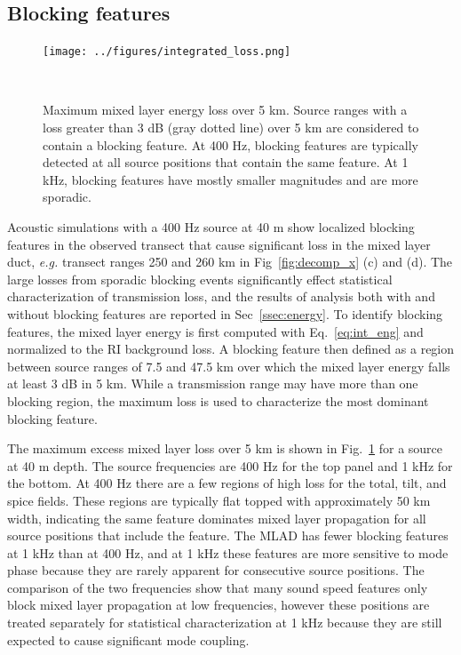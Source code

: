 \documentclass[preprint,NumberedRefs]{JASA}
\begin{document}
\subsection{Blocking features}\label{ssec:blocking}
\begin{figure}
\texttt{[image: ../figures/integrated\_loss.png]}
    \caption{Maximum mixed layer energy loss over 5 km. Source ranges with a loss greater than 3 dB (gray dotted line) over 5 km are considered to contain a blocking feature. At 400 Hz, blocking features are typically detected at all source positions that contain the same feature. At 1 kHz, blocking features have mostly smaller magnitudes and are more sporadic.}
    \label{fig:blocking}
\end{figure}

Acoustic simulations with a 400 Hz source at 40 m show localized blocking features in the observed transect that cause significant loss in the mixed layer duct, \emph{e.g.} transect ranges 250 and 260 km in Fig~\ref{fig:decomp_x} (c) and (d). The large losses from sporadic blocking events significantly effect statistical characterization of transmission loss, and the results of analysis both with and without blocking features are reported in Sec~\ref{ssec:energy}. To identify blocking features, the mixed layer energy is first computed with Eq.~\eqref{eq:int_eng} and normalized to the RI background loss. A blocking feature then defined as a region between source ranges of 7.5 and 47.5 km over which the mixed layer energy falls at least 3 dB in 5 km. While a transmission range may have more than one blocking region, the maximum loss is used to characterize the most dominant blocking feature.

The maximum excess mixed layer loss over 5 km is shown in Fig.~\ref{fig:blocking} for a source at 40 m depth. The source frequencies are 400 Hz for the top panel and 1 kHz for the bottom. At 400 Hz there are a few regions of high loss for the total, tilt, and spice fields. These regions are typically flat topped with approximately 50 km width, indicating the same feature dominates mixed layer propagation for all source positions that include the feature. The MLAD has fewer blocking features at 1 kHz than at 400 Hz, and at 1 kHz these features are more sensitive to mode phase because they are rarely apparent for consecutive source positions. The comparison of the two frequencies show that many sound speed features only block mixed layer propagation at low frequencies, however these positions are treated separately for statistical characterization at 1 kHz because they are still expected to cause significant mode coupling.
\end{document}
